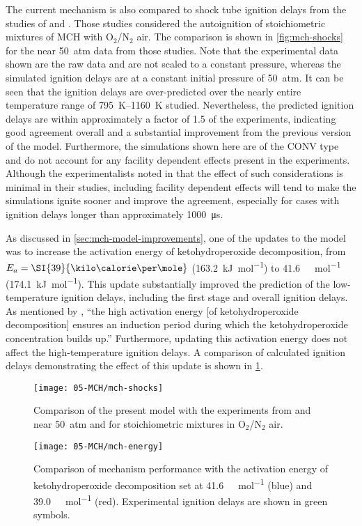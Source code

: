 \documentclass[../main.tex]{subfiles}
\begin{document}
The current mechanism is also compared to shock tube ignition delays from the
studies of \textcite{Vasu2009} and \textcite{Vanderover2009}. Those studies
considered the autoignition of stoichiometric mixtures of MCH with O$_2$/N$_2$
air. The comparison is shown in \cref{fig:mch-shocks} for the near \SI{50}{atm}
data from those studies. Note that the experimental data shown are the raw
data and are not scaled to a constant pressure, whereas the simulated
ignition delays are at a constant initial pressure of \SI{50}{atm}. It can be seen
that the ignition delays are over-predicted over the nearly entire temperature
range of \SIrange{795}{1160}{\kelvin} studied. Nevertheless, the predicted ignition delays are
within approximately a factor of 1.5 of the experiments, indicating good
agreement overall and a substantial improvement from the previous version of
the model. Furthermore, the simulations shown here are of the CONV type and
do not account for any facility dependent effects present in the experiments.
Although the experimentalists noted in \cite{Vasu2009,Vanderover2009} that the
effect of such considerations is minimal in their studies, including facility
dependent effects will tend to make the simulations ignite sooner and improve
the agreement, especially for cases with ignition delays longer than
approximately \SI{1000}{\micro\second}.

As discussed in \cref{sec:mch-model-improvements}, one of the updates to the model
was to increase the activation energy of ketohydroperoxide decomposition, from
$E_a=\SI{39}{\kilo\calorie\per\mole}$ (\SI{163.2}{\kilo\joule\per\mole}) to
\SI{41.6}{\kilo\calorie\per\mole} (\SI{174.1}{\kilo\joule\per\mole}). This
update substantially improved the prediction of the low-temperature ignition
delays, including the first stage and overall ignition delays. As mentioned by
\textcite{Curran2002}, ``the high activation energy [of ketohydroperoxide
decomposition] ensures an induction period during which the ketohydroperoxide
concentration builds up.'' Furthermore, updating this activation energy does not
affect the high-temperature ignition delays. A comparison of calculated
ignition delays demonstrating the effect of this update is shown in
\cref{fig:mch-energy}.

\begin{figure}
    \begin{floatrow}
        \ffigbox
            {\texttt{[image: 05-MCH/mch-shocks]}}
            {\caption{Comparison of the present model with the experiments from
                \textcite{Vasu2009} and \textcite{Vanderover2009} near \SI{50}{atm}
                and for stoichiometric mixtures in O$_2$/N$_2$ air.}
            \label{fig:mch-shocks}}
        \ffigbox
            {\texttt{[image: 05-MCH/mch-energy]}}
            {\caption{Comparison of mechanism performance with the activation energy
                of ketohydroperoxide decomposition set at \SI{41.6}{\kilo\calorie\per\mole} (blue) and
                \SI{39.0}{\kilo\calorie\per\mole} (red). Experimental ignition delays are shown in
                green symbols.}
            \label{fig:mch-energy}}
    \end{floatrow}
\end{figure}
\end{document}
